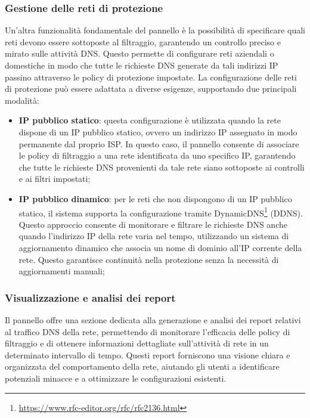 \subsubsection{Gestione delle reti di protezione}
Un'altra funzionalità fondamentale del pannello è la possibilità di specificare quali reti devono essere sottoposte al filtraggio, garantendo un controllo preciso e mirato sulle attività DNS. Questo permette di configurare reti aziendali o domestiche in modo che tutte le richieste DNS generate da tali indirizzi IP passino attraverso le policy di protezione impostate. La configurazione delle reti di protezione può essere adattata a diverse esigenze, supportando due principali modalità:
\begin{itemize}
  \item \textbf{IP pubblico statico}: questa configurazione è utilizzata quando la rete dispone di un IP pubblico statico, ovvero un indirizzo IP assegnato in modo permanente dal proprio ISP. In questo caso, il pannello consente di associare le policy di filtraggio a una rete identificata da uno specifico IP, garantendo che tutte le richieste DNS provenienti da tale rete siano sottoposte ai controlli e ai filtri impostati;

  \item \textbf{IP pubblico dinamico}: per le reti che non dispongono di un IP pubblico statico, il sistema supporta la configurazione tramite DynamicDNS\footnote{\url{https://www.rfc-editor.org/rfc/rfc2136.html}} (DDNS). Questo approccio consente di monitorare e filtrare le richieste DNS anche quando l’indirizzo IP della rete varia nel tempo, utilizzando un sistema di aggiornamento dinamico che associa un nome di dominio all’IP corrente della rete. Questo garantisce continuità nella protezione senza la necessità di aggiornamenti manuali;
\end{itemize}

\subsubsection{Visualizzazione e analisi dei report}
Il pannello offre una sezione dedicata alla generazione e analisi dei report relativi al traffico DNS della rete, permettendo di monitorare l’efficacia delle policy di filtraggio e di ottenere informazioni dettagliate sull’attività di rete in un determinato intervallo di tempo. Questi report forniscono una visione chiara e organizzata del comportamento della rete, aiutando gli utenti a identificare potenziali minacce e a ottimizzare le configurazioni esistenti.

